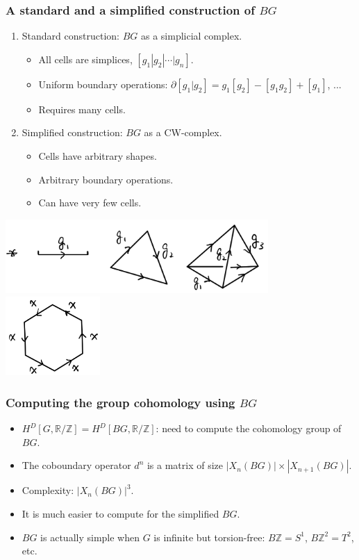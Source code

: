 \documentclass[xcolor=table, aspectratio=169]{beamer}
\newcommand{\uone}{\mathbb R/\mathbb Z}
\begin{document}
\begin{frame}
	\frametitle{A standard and a simplified construction of $BG$}
	\begin{enumerate}
		\item Standard construction: $BG$ as a simplicial complex.
		\begin{itemize}
			\item All cells are simplices, $[g_1|g_2|\cdots|g_n]$.
			\item Uniform boundary operations:
			$\partial[g_1|g_2]=g_1[g_2]-[g_1g_2]+[g_1]$, ...
			\item Requires many cells.
		\end{itemize}
		\item Simplified construction: $BG$ as a CW-complex.
		\begin{itemize}
			\item Cells have arbitrary shapes.
			\item Arbitrary boundary operations.
			\item Can have very few cells.
		\end{itemize}
	\end{enumerate}
	\begin{center}
		\includegraphics[width=10cm]{bg-std}~~~~
		\includegraphics[height=3cm]{z6-1}
	\end{center}
\end{frame}

\begin{frame}
	\frametitle{Computing the group cohomology using $BG$}
	\begin{itemize}
		\item $H^D[G, \uone] = H^D[BG, \uone]$: need to compute the cohomology group of $BG$.
		\item The coboundary operator $d^n$ is a matrix of size $|X_n(BG)|\times |X_{n+1}(BG)|$.
		\item Complexity: $|X_n(BG)|^3$.
		\item It is much easier to compute for the simplified $BG$.
		\item $BG$ is actually simple when $G$ is infinite but torsion-free:
		$B\mathbb Z=S^1$, $B\mathbb Z^2=T^2$, etc.
	\end{itemize}
\end{frame}
\end{document}
